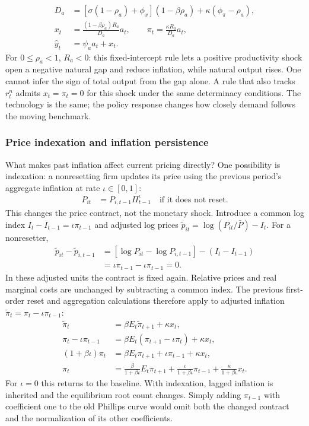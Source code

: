 \begin{align}
 D_a&=[\sigma(1-\rho_a)+\phi_x](1-\beta\rho_a)
                                  +\kappa(\phi_\pi-\rho_a),\\
 x_t&=\frac{(1-\beta\rho_a)R_a}{D_a}a_t,\qquad
 \pi_t=\frac{\kappa R_a}{D_a}a_t,\\
 \hat y_t&=\psi_a a_t+x_t.
\end{align}
For $0\leq\rho_a<1$, $R_a<0$: this fixed-intercept rule lets a positive
productivity shock open a negative natural gap and reduce inflation, while
natural output rises. One cannot infer the sign of total output from the gap
alone. A rule that also tracks $r_t^n$ admits $x_t=\pi_t=0$ for this shock
under the same determinacy conditions. The technology is the same; the policy
response changes how closely demand follows the moving benchmark.

\subsubsection{Price indexation and inflation persistence}

What makes past inflation affect current pricing directly? One possibility
is indexation: a nonresetting firm updates its price using the previous
period's aggregate inflation at rate $\iota\in[0,1]$:
\begin{align}
 P_{it}&=P_{i,t-1}\Pi_{t-1}^{\iota}\quad\text{if it does not reset}.
\end{align}
This changes the price contract, not the monetary shock. Introduce a common
log index $I_t-I_{t-1}=\iota\pi_{t-1}$ and adjusted log prices
$\tilde p_{it}=\log(P_{it}/\bar P)-I_t$.
For a nonresetter,
\begin{align}
 \tilde p_{it}-\tilde p_{i,t-1}
 &=[\log P_{it}-\log P_{i,t-1}]-(I_t-I_{t-1})\\
 &=\iota\pi_{t-1}-\iota\pi_{t-1}=0.
\end{align}
In these adjusted units the contract is fixed again. Relative prices and real
marginal costs are unchanged by subtracting a common index. The previous
first-order reset and aggregation calculations therefore apply to adjusted
inflation $\tilde\pi_t=\pi_t-\iota\pi_{t-1}$:
\begin{align}
 \tilde\pi_t&=\beta E_t\tilde\pi_{t+1}+\kappa x_t,\\
 \pi_t-\iota\pi_{t-1}
 &=\beta E_t(\pi_{t+1}-\iota\pi_t)+\kappa x_t,\\
 (1+\beta\iota)\pi_t
 &=\beta E_t\pi_{t+1}+\iota\pi_{t-1}+\kappa x_t,\\
 \pi_t&=\frac\beta{1+\beta\iota}E_t\pi_{t+1}
       +\frac\iota{1+\beta\iota}\pi_{t-1}
       +\frac\kappa{1+\beta\iota}x_t.
\end{align}
For $\iota=0$ this returns to the baseline. With indexation, lagged inflation
is inherited and the equilibrium root count changes. Simply adding
$\pi_{t-1}$ with coefficient one to the old Phillips curve would omit both
the changed contract and the normalization of its other coefficients.

